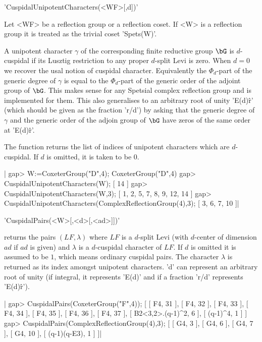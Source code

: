
'CuspidalUnipotentCharacters(<WF>[,d])'

Let  <WF>  be  a  reflection  group  or  a  reflection  coset.  If <W> is a
reflection  group it is  treated as the  trivial coset 'Spets(W)'.

A  unipotent character $\gamma$ of the corresponding finite reductive group
$\bG$  is $d$-cuspidal if  its Lusztig restriction  to any proper $d$-split
Levi  is zero. When $d=0$ we recover the usal notion of cuspidal character.
Equivalently  the $\Phi_d$-part of the generic  degree of $\gamma$ is equal
to  the $\Phi_d$-part of the  generic order of the  adjoint group of $\bG$.
This  makes  sense  for  any  Spetsial  complex  reflection  group  and  is
implemented  for them. This also generalises  to an arbitrary root of unity
'E(d)\^r'  (which should be given as the fraction 'r/d') by asking that the
generic  degree of $\gamma$  and the generic  order of the  adjoin group of
$\bG$ have zeros of the same order at 'E(d)\^r'.

The function returns the list of indices of unipotent characters which are
$d$-cuspidal. If $d$ is omitted, it is taken to be $0$.

|    gap> W:=CoxeterGroup("D",4);
    CoxeterGroup("D",4)
    gap> CuspidalUnipotentCharacters(W);
    [ 14 ]
    gap> CuspidalUnipotentCharacters(W,3);
    [ 1, 2, 5, 7, 8, 9, 12, 14 ]
    gap> CuspidalUnipotentCharacters(ComplexReflectionGroup(4),3);
    [ 3, 6, 7, 10 ]|


'CuspidalPairs(<W>[,<d>[,<ad>]])'

returns  the  pairs  $(LF,\lambda)$  where  $LF$  is a $d$-split Levi (with
$d$-center  of  dimension  $ad$  if  $ad$  is  given)  and  $\lambda$  is a
$d$-cuspidal  character of $LF$. If $d$ is omitted it is assumed to be $1$,
which means ordinary cuspidal pairs. The character $\lambda$ is returned as
its index amongst unipotent characters. 'd' can represent an arbitrary root
of  unity  (if  integral,  it  represents  'E(d)'  and  if a fraction 'r/d'
represents 'E(d)\^r').

|    gap> CuspidalPairs(CoxeterGroup("F",4));
    [ [ F4, 31 ], [ F4, 32 ], [ F4, 33 ], [ F4, 34 ], [ F4, 35 ],
      [ F4, 36 ], [ F4, 37 ], [ B2<3,2>.(q-1)^2, 6 ], [ (q-1)^4, 1 ] ]
    gap> CuspidalPairs(ComplexReflectionGroup(4),3);
    [ [ G4, 3 ], [ G4, 6 ], [ G4, 7 ], [ G4, 10 ], [ (q-1)(q-E3), 1 ] ]|
